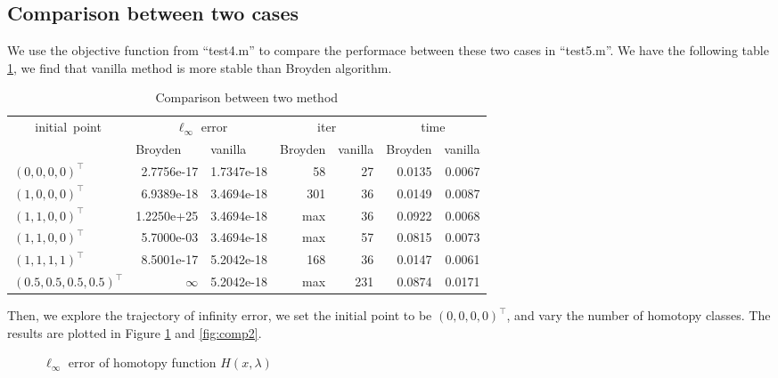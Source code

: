 \documentclass[conference,onecolumn, 12pt]{IEEEtran}
\begin{document}
\subsection{Comparison between two cases}
We use the objective function from ``test4.m'' to compare the performace between these two cases in ``test5.m''. We have the following table \ref{tab:comp}, we find that vanilla method is more stable than Broyden algorithm.
\begin{table}[htbp]
    \centering
    \caption{Comparison between two method}
      \begin{tabular}{lrrlrrr}
        \toprule
      \multicolumn{1}{c}{\multirow{2}[0]{*}{initial point}} & \multicolumn{2}{c}{$\ell_\infty$ error} & \multicolumn{2}{c}{iter} & \multicolumn{2}{c}{time} \\
      \cmidrule{2-3} \cmidrule{4-5}\cmidrule{6-7}
            & \multicolumn{1}{l}{Broyden} & \multicolumn{1}{l}{vanilla} & Broyden & \multicolumn{1}{l}{vanilla} & \multicolumn{1}{l}{Broyden} & \multicolumn{1}{l}{vanilla} \\
            \midrule
      $(0,0,0,0)^\top$ & 2.7756e-17 & 1.7347e-18 & \multicolumn{1}{r}{58} & 27    & 0.0135 & 0.0067 \\
      $(1,0,0,0)^\top$ & 6.9389e-18 & 3.4694e-18 & \multicolumn{1}{r}{301} & 36    & 0.0149 & 0.0087 \\
      $(1,1,0,0)^\top$ & 1.2250e+25 & 3.4694e-18 & \multicolumn{1}{r}{max} & 36    & 0.0922 & 0.0068 \\
      $(1,1,0,0)^\top$ & 5.7000e-03 & 3.4694e-18 & \multicolumn{1}{r}{max} & 57    & 0.0815 & 0.0073 \\
      $(1,1,1,1)^\top$ & 8.5001e-17 & 5.2042e-18 & \multicolumn{1}{r}{168} & 36    & 0.0147 & 0.0061 \\
      $(0.5,0.5,0.5,0.5)^\top$ & $\infty$ & 5.2042e-18 & \multicolumn{1}{r}{max}   & 231   & 0.0874 & 0.0171 \\
      \bottomrule
      \end{tabular}%
    \label{tab:comp}%
  \end{table}%
  
Then, we explore the trajectory of infinity error, we set the initial point to be $(0,0,0,0)^\top$, and vary the number of homotopy classes. The results are plotted in Figure \ref{fig:comp1} and \ref{fig:comp2}.
\begin{figure}[!htbp]
    \centering
    \subfigure[num of homotopy classes $=10$]{
    \resizebox{0.8\textwidth}{!}{
        
    }
    }
    \subfigure[num of homotopy classes $=5$]{
    \resizebox{0.8\textwidth}{!}{
        
    }
    }
    \subfigure[num of homotopy classes$=2$]{
    \resizebox{0.8\textwidth}{!}{
        
    }
    }
    \caption{$\ell_\infty$ error of homotopy function $H(x,\lambda)$}
    \label{fig:comp1}
\end{figure}
\end{document}
